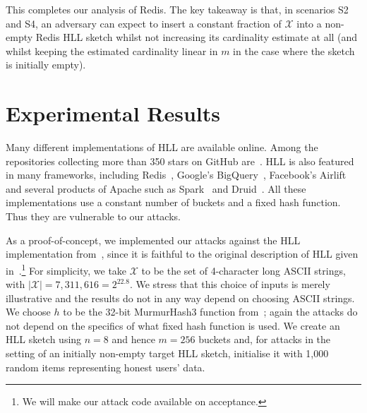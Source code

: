 \documentclass[sigconf, anonymous, dvipsnames]{acmart} %
\begin{document}
This completes our analysis of Redis. The key takeaway is that, in scenarios S2 and S4, an adversary can expect to insert a constant fraction of ${\mathcal{X}}$ into a non-empty Redis HLL sketch whilst not increasing its cardinality estimate at all (and whilst keeping the estimated cardinality linear in $m$ in the case where the sketch is initially empty).


\section{Experimental Results}\label{sec:exp}
Many different implementations of HLL are available online. Among the repositories collecting more than 350 stars on GitHub are~\cite{clahll,datasketch}. HLL is also featured in many frameworks, including Redis~\cite{redis}, Google's BigQuery~\cite{bigquery}, Facebook's Airlift~\cite{airlift} and several products of Apache such as Spark~\cite{spahll} and Druid~\cite{druhll}. All these implementations use a constant number of buckets and a fixed hash function. Thus they are  vulnerable to our attacks. %

As a proof-of-concept, we implemented our attacks against the HLL implementation from~\cite{clahll}, since it is faithful to the original description of HLL given in~\cite{hll}.\footnote{We will make our attack code available on acceptance.}
For simplicity, we take ${\mathcal{X}}$ to be the set of 4-character long ASCII strings, with $\lvert {\mathcal{X}} \rvert = 7,311,616= 2^{22.8}$. We stress that this choice of inputs is merely illustrative and the results do not in any way depend on choosing ASCII strings. We choose $h$ to be the 32-bit MurmurHash3 function from~\cite{murmur3code}; again the attacks do not depend on the specifics of what fixed hash function is used.
We create an HLL sketch using $n=8$ and hence $m=256$ buckets and, for attacks in the setting of an initially non-empty target HLL sketch, initialise it with 1,000 random items representing honest users' data.
\end{document}
